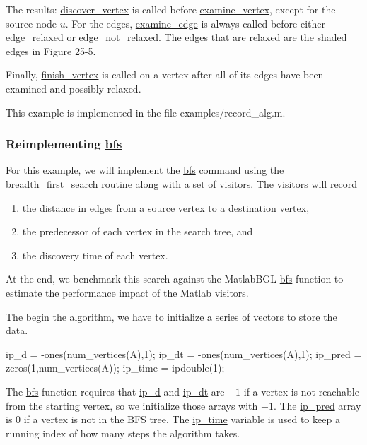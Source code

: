 \documentclass[12pt]{article}
\newcommand{\mycmd}[1]{\url{#1}}
\newcommand{\mypath}[1]{{\ttfamily \small #1}}
\begin{document}
 The results: \mycmd{discover_vertex} is called before \mycmd{examine_vertex}, 
 except for the source node $u$. For the edges, \mycmd{examine_edge} is always called before either \mycmd{edge_relaxed}
 or \mycmd{edge_not_relaxed}.  The edges that are relaxed are the shaded edges in
 Figure 25-5.

 Finally, \mycmd{finish_vertex} is called on a vertex after all of its edges have
 been examined and possibly relaxed.  	
 
 This example is implemented in the file \mypath{examples/record\_alg.m}.
 

\subsubsection*{Reimplementing \mycmd{bfs}}
\label{subsec:mbgl-bfs}

 For this example, we will implement the \mycmd{bfs} command using the \mycmd{breadth_first_search} routine along with a set of visitors.  The visitors will record
 \begin{enumerate}
 \item the distance in edges from a source vertex to a destination vertex,
 \item the predecessor of each vertex in the search tree, and
 \item the discovery time of each vertex.
 \end{enumerate}
 At the end, we benchmark this search against the MatlabBGL \mycmd{bfs} function to estimate the performance impact of the Matlab visitors.
 
 	The begin the algorithm, we have to initialize a series of vectors to store the data.
 	\begin{mcode}
ip_d = -ones(num_vertices(A),1);
ip_dt = -ones(num_vertices(A),1);
ip_pred = zeros(1,num_vertices(A));
ip_time = ipdouble(1);
 	\end{mcode}
 	The \mycmd{bfs} function requires that \mycmd{ip_d} and \mycmd{ip_dt} are $-1$ if a vertex is not reachable from the starting vertex, so we initialize those arrays with $-1$.  The \mycmd{ip_pred} array is 0 if a vertex is not in the BFS tree.  The \mycmd{ip_time} variable is used to keep a running index of how many steps the algorithm takes.
 	
\end{document}
